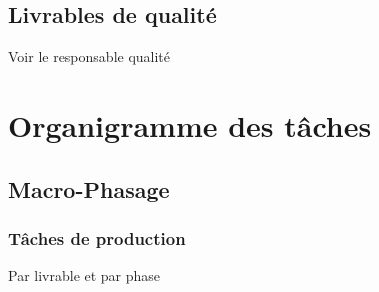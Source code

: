 \subsection{Livrables de qualité}
Voir le responsable qualité
\section{Organigramme des tâches}
\subsection{Macro-Phasage}

\subsubsection {Tâches de production} 
    Par livrable et par phase 
